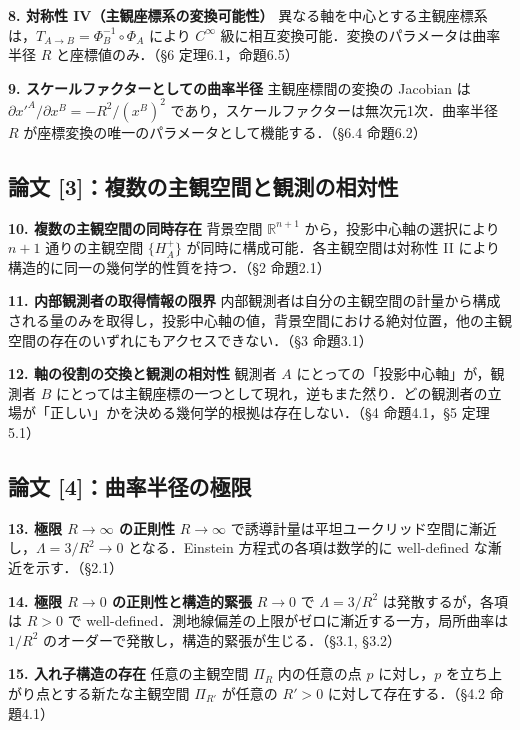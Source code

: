 \documentclass[12pt,a4paper]{ltjsarticle}
\begin{document}
\textbf{8. 対称性 IV（主観座標系の変換可能性）}\quad
異なる軸を中心とする主観座標系は，$T_{A \to B} = \Phi_B^{-1} \circ \Phi_A$ により $C^\infty$ 級に相互変換可能．変換のパラメータは曲率半径 $R$ と座標値のみ．（\S 6 定理6.1，命題6.5）

\textbf{9. スケールファクターとしての曲率半径}\quad
主観座標間の変換の Jacobian は $\partial x'^A/\partial x^B = -R^2/(x^B)^2$ であり，スケールファクターは無次元1次．曲率半径 $R$ が座標変換の唯一のパラメータとして機能する．（\S 6.4 命題6.2）

\subsection*{論文 [3]：複数の主観空間と観測の相対性}

\textbf{10. 複数の主観空間の同時存在}\quad
背景空間 $\mathbb{R}^{n+1}$ から，投影中心軸の選択により $n+1$ 通りの主観空間 $\{H_A^+\}$ が同時に構成可能．各主観空間は対称性 II により構造的に同一の幾何学的性質を持つ．（\S 2 命題2.1）

\textbf{11. 内部観測者の取得情報の限界}\quad
内部観測者は自分の主観空間の計量から構成される量のみを取得し，投影中心軸の値，背景空間における絶対位置，他の主観空間の存在のいずれにもアクセスできない．（\S 3 命題3.1）

\textbf{12. 軸の役割の交換と観測の相対性}\quad
観測者 $A$ にとっての「投影中心軸」が，観測者 $B$ にとっては主観座標の一つとして現れ，逆もまた然り．どの観測者の立場が「正しい」かを決める幾何学的根拠は存在しない．（\S 4 命題4.1，\S 5 定理5.1）

\subsection*{論文 [4]：曲率半径の極限}

\textbf{13. 極限 $R \to \infty$ の正則性}\quad
$R \to \infty$ で誘導計量は平坦ユークリッド空間に漸近し，$\Lambda = 3/R^2 \to 0$ となる．Einstein 方程式の各項は数学的に well-defined な漸近を示す．（\S 2.1）

\textbf{14. 極限 $R \to 0$ の正則性と構造的緊張}\quad
$R \to 0$ で $\Lambda = 3/R^2$ は発散するが，各項は $R > 0$ で well-defined．測地線偏差の上限がゼロに漸近する一方，局所曲率は $1/R^2$ のオーダーで発散し，構造的緊張が生じる．（\S 3.1, \S 3.2）

\textbf{15. 入れ子構造の存在}\quad
任意の主観空間 $\Pi_R$ 内の任意の点 $p$ に対し，$p$ を立ち上がり点とする新たな主観空間 $\Pi_{R'}$ が任意の $R' > 0$ に対して存在する．（\S 4.2 命題4.1）
\end{document}
